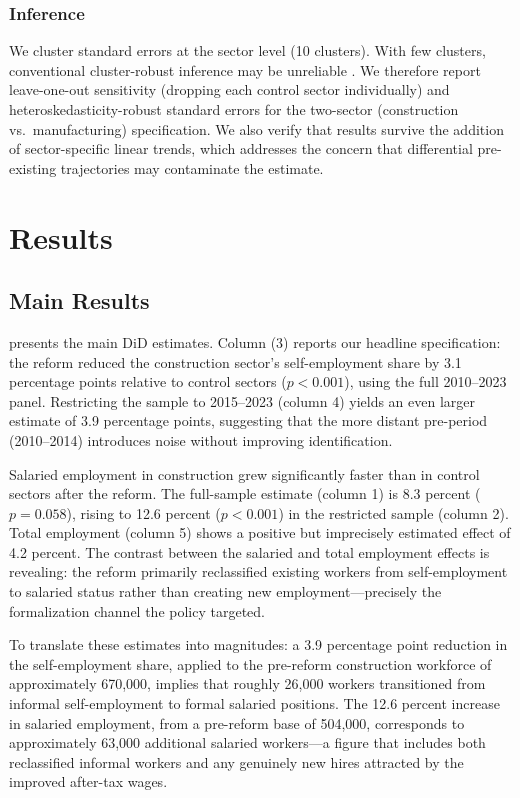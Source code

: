 \documentclass[12pt]{article}
\begin{document}
\subsubsection*{Inference} We cluster standard errors at the sector level (10 clusters). With few clusters, conventional cluster-robust inference may be unreliable \citep{cameron2008bootstrap}. We therefore report leave-one-out sensitivity (dropping each control sector individually) and heteroskedasticity-robust standard errors for the two-sector (construction vs.\ manufacturing) specification. We also verify that results survive the addition of sector-specific linear trends, which addresses the concern that differential pre-existing trajectories may contaminate the estimate.

\section{Results}
\label{sec:results}

\subsection{Main Results}

 presents the main DiD estimates. Column (3) reports our headline specification: the reform reduced the construction sector's self-employment share by 3.1 percentage points relative to control sectors ($p < 0.001$), using the full 2010--2023 panel. Restricting the sample to 2015--2023 (column 4) yields an even larger estimate of 3.9 percentage points, suggesting that the more distant pre-period (2010--2014) introduces noise without improving identification.

Salaried employment in construction grew significantly faster than in control sectors after the reform. The full-sample estimate (column 1) is 8.3 percent ($p = 0.058$), rising to 12.6 percent ($p < 0.001$) in the restricted sample (column 2). Total employment (column 5) shows a positive but imprecisely estimated effect of 4.2 percent. The contrast between the salaried and total employment effects is revealing: the reform primarily reclassified existing workers from self-employment to salaried status rather than creating new employment---precisely the formalization channel the policy targeted.

To translate these estimates into magnitudes: a 3.9 percentage point reduction in the self-employment share, applied to the pre-reform construction workforce of approximately 670,000, implies that roughly 26,000 workers transitioned from informal self-employment to formal salaried positions. The 12.6 percent increase in salaried employment, from a pre-reform base of 504,000, corresponds to approximately 63,000 additional salaried workers---a figure that includes both reclassified informal workers and any genuinely new hires attracted by the improved after-tax wages.
\end{document}
